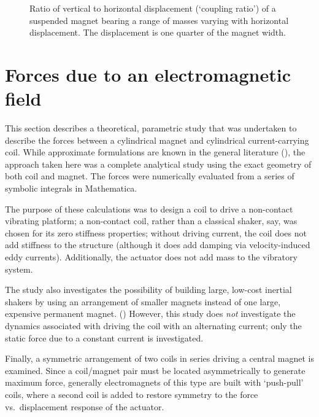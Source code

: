 \begin{figure}
  \caption{Ratio of vertical to horizontal displacement (`coupling ratio') of 
  a suspended magnet bearing a range of masses varying with horizontal 
  displacement. The displacement is one quarter of the magnet width.}
\end{figure}

\section{Forces due to an electromagnetic field}

This section describes a theoretical, parametric study that was undertaken to
describe the forces between a cylindrical magnet and cylindrical
current-carrying coil. While approximate formulations are known in the general
literature (), the approach taken here was a complete
analytical study using the exact geometry of both coil and magnet. The
forces were numerically evaluated from a series of symbolic integrals in
Mathematica.

The purpose of these calculations was to design a coil to drive a non-contact
vibrating platform; a non-contact coil, rather than a classical shaker, say,
was chosen for its zero stiffness properties; without driving current, the
coil does not add stiffness to the structure (although it does add damping via
velocity-induced eddy currents). Additionally, the actuator does not add mass
to the vibratory system. 

The study also investigates the possibility of building large, low-cost
inertial shakers by using an arrangement of smaller magnets instead of one
large, expensive permanent magnet. () However, this study does \emph{not} investigate the dynamics
associated with driving the coil with an alternating current; only the static
force due to a constant current is investigated.


Finally, a symmetric arrangement of two coils in series driving a central
magnet is examined. Since a coil/magnet pair must be located asymmetrically to
generate maximum force, generally electromagnets of this type are built with
`push-pull' coils, where a second coil is added to restore symmetry to the
force vs.\ displacement response of the actuator.

